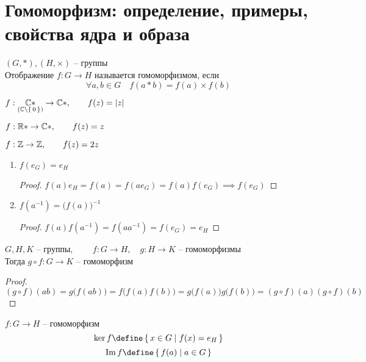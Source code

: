 \section{Гомоморфизм: определение, примеры, свойства ядра и образа}

\begin{definition}
	$ (G, *), (H, \times) $ -- группы \\
	Отображение $ f : G \to H $ называется гомоморфизмом, если
	$$ \forall a, b \in G \quad f(a * b) = f(a) \times f(b) $$
\end{definition}

\begin{exmpls}
	\item $ f : \underset{(\mathbb{C} \setminus \set{0})}{\mathbb{C}*} \to \mathbb{C}*, \qquad f(z) = |z| $
	\item $ f : \mathbb{R}* \to \mathbb{C}*, \qquad f(z) = z $
	\item $ f : \mathbb{Z} \to \mathbb{Z}, \qquad f(z) = 2z $
\end{exmpls}

\begin{props}
	\item
	\begin{enumerate}
		\item $ f(e_G) = e_H $
		\begin{proof}
			$ f(a)e_H = f(a) = f(ae_G) = f(a)f(e_G) \implies f(e_G) $
		\end{proof}
		\item $ f(a^{-1}) = \bigg( f(a) \bigg)^{-1} $
		\begin{proof}
			$ f(a)f(a^{-1}) = f(aa^{-1}) = f(e_G) = e_H $
		\end{proof}
	\end{enumerate}
	\item $ G, H, K $ -- группы, $ \qquad f : G \to H, \quad g : H \to K $ -- гомоморфизмы \\
	Тогда $ g \circ f : G \to K $ -- гомоморфизм
	\begin{proof}
		$$ (g \circ f)(ab) = g \big( f(ab) \big) = f\big( f(a)f(b) \big) = g \big( f(a) \big) g \big( f(b) \big) = (g \circ f)(a) (g \circ f)(b) $$
	\end{proof}
\end{props}

\begin{definition}
	$ f : G \to H $ -- гомоморфизм
	$$ \ker f \define \set{x \in G | f(x) = e_H} $$
	$$ \Img f \define \set{f(a) | a \in G} $$
\end{definition}

